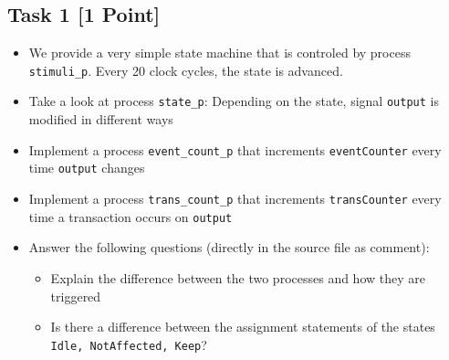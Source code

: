 \documentclass[12pt,epsf,makeidx,oneside]{book}
\begin{document}
\subsection{Task 1 [1 Point]}
\begin{itemize}[noitemsep]
  \item We provide a very simple state machine that is controled by process {\tt stimuli\_p}. Every 20 clock cycles, the state is advanced.
  \item Take a look at process {\tt state\_p}: Depending on the state, signal {\tt output} is modified in different ways
  \item Implement a process {\tt event\_count\_p} that increments {\tt eventCounter} every time {\tt output} changes
  \item Implement a process {\tt trans\_count\_p} that increments {\tt transCounter} every time a transaction occurs on {\tt output}
  \item Answer the following questions (directly in the source file as comment):
  \begin{itemize}[noitemsep]
    \item Explain the difference between the two processes and how they are triggered
    \item Is there a difference between the assignment statements of the states {\tt Idle, NotAffected, Keep}?
  \end{itemize}
\end{itemize}
\end{document}
